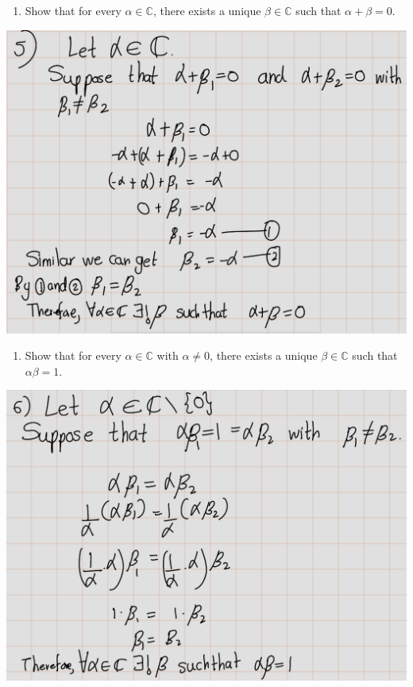 \documentclass[
]{book}
\providecommand{\tightlist}{%
  \setlength{\itemsep}{0pt}\setlength{\parskip}{0pt}}
\theoremstyle{definition}
\theoremstyle{definition}
\theoremstyle{definition}
\theoremstyle{definition}
\theoremstyle{remark}
\begin{document}
\begin{enumerate}
\def\labelenumi{\arabic{enumi}.}
\setcounter{enumi}{4}
\tightlist
\item
  Show that for every \(\alpha \in \mathbb{C}\), there exists a unique \(\beta \in \mathbb{C}\) such that \(\alpha + \beta = 0\).
\end{enumerate}

\includegraphics[width=15.69in]{fig/Ex1A/Ex5}

\begin{enumerate}
\def\labelenumi{\arabic{enumi}.}
\setcounter{enumi}{5}
\tightlist
\item
  Show that for every \(\alpha \in \mathbb{C}\) with \(\alpha \neq 0\), there exists a unique \(\beta \in \mathbb{C}\) such that \(\alpha\beta = 1\).
\end{enumerate}

\includegraphics[width=16.06in]{fig/Ex1A/Ex6}
\end{document}
